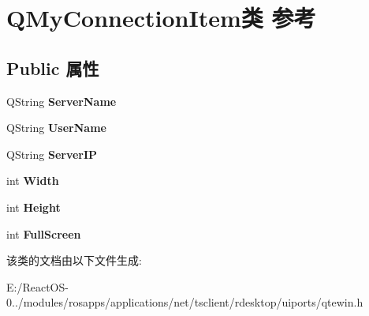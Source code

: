 \hypertarget{class_q_my_connection_item}{}\section{Q\+My\+Connection\+Item类 参考}
\label{class_q_my_connection_item}
\subsection*{Public 属性}
\begin{DoxyCompactItemize}
\item 
\mbox{\label{class_q_my_connection_item_aa5c5515d3db4dba9b738e6939882a2cb}} 
Q\+String {\bfseries Server\+Name}
\item 
\mbox{\label{class_q_my_connection_item_a630c98eb58f9dccfe182cb99761f881a}} 
Q\+String {\bfseries User\+Name}
\item 
\mbox{\label{class_q_my_connection_item_a590ff13582023409baf318dbd3296aa8}} 
Q\+String {\bfseries Server\+IP}
\item 
\mbox{\label{class_q_my_connection_item_a0afb2c500a33389b14a9603979590f00}} 
int {\bfseries Width}
\item 
\mbox{\label{class_q_my_connection_item_a5da569a62f157d147c5a39340c4c0783}} 
int {\bfseries Height}
\item 
\mbox{\label{class_q_my_connection_item_ac80ac92c5d60ead2fda9116591175562}} 
int {\bfseries Full\+Screen}
\end{DoxyCompactItemize}


该类的文档由以下文件生成\+:\begin{DoxyCompactItemize}
\item 
E\+:/\+React\+O\+S-\/0../modules/rosapps/applications/net/tsclient/rdesktop/uiports/qtewin.\+h\end{DoxyCompactItemize}
